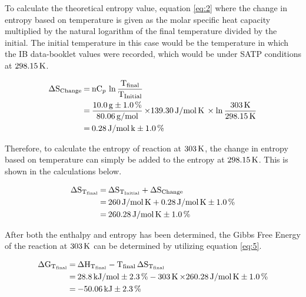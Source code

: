\documentclass{article}
\begin{document}
\noindent
To calculate the theoretical entropy value, equation \ref{eq:2} where the change in entropy based on temperature is given as the molar specific heat capacity multiplied by the natural logarithm of the final temperature divided by the initial. The initial temperature in this case would be the temperature in which the IB data-booklet values were recorded, which would be under SATP conditions at $\ce{298.15K}$.
\begin{tcolorbox}[title=Calculation of Entropy Change from Temperature ($\ce{\Delta S_{Change}}$)]
\begin{equation}
    \begin{split}
        \ce{ 
        \Delta S_{Change} &= nC_p \ln \frac{T_{final}}{T_{Initial}} \\
        &= \frac{10.0 g \pm 1.0\%}{80.06 g/mol} \times} \ce{139.30 J/mol K \times \ln \frac{303K}{298.15K} \\
        &= 0.28 J/mol k \pm 1.0\%
        }
    \end{split}
\end{equation}
\end{tcolorbox}

\noindent
Therefore, to calculate the entropy of reaction at $\ce{303K}$, the change in entropy based on temperature can simply be added to the entropy at $\ce{298.15K}$. This is shown in the calculations below.

\begin{tcolorbox}[title=Calculation of Entropy of Reaction at $\ce{303K}$ ($\ce{\Delta S_{T_{final}}})$]
\begin{equation}
    \begin{split}
        \ce{
        \Delta S_{T_{final}} &= \Delta S_{T_{Initial}} + \Delta S_{Change} \\
        &= 260 J/mol K + 0.28 J/mol K \pm 1.0\% \\
        &= 260.28 J/mol K \pm 1.0\%
        }
    \end{split}
\end{equation}
\end{tcolorbox}

\noindent
After both the enthalpy and entropy has been determined, the Gibbs Free Energy of the reaction at $\ce{303K}$ can be determined by utilizing equation \ref{eq:5}.

\begin{tcolorbox}[title=Calculation of Gibbs Free Energy at $\ce{303K}$ ($\ce{\Delta G_{T_{final}}}$)]
\begin{equation}
    \begin{split}
        \ce{
        \Delta G_{T_{final}} &= \Delta H_{T_{final}} - T_{final} \Delta S_{T_{final}} \\
        &= 28.8 kJ/mol \pm 2.3\% - 303K \times} \ce{260.28 J/mol K \pm 1.0\% \\ 
        &= -50.06 kJ \pm 2.3\%
        }
    \end{split}
\end{equation}
\end{tcolorbox}
\end{document}
